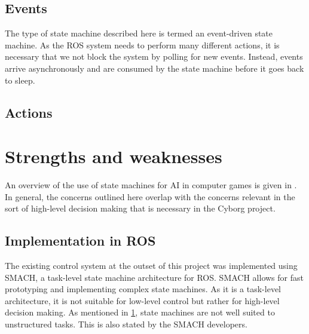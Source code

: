 \documentclass[\rootfolder/main.tex]{subfiles}
\begin{document}

\subsection{Events}

The type of state machine described here is termed an event-driven state machine.
As the ROS system needs to perform many different actions, it is necessary that we not block the system by polling for new events.
Instead, events arrive asynchronously and are consumed by the state machine before it goes back to sleep.


\subsection{Actions}

\section{Strengths and weaknesses}
\label{sec:state_machine_strength_weaknesses}

An overview of the use of state machines for AI in computer games is given in \cite{Millington2009}.
In general, the concerns outlined here overlap with the concerns relevant in the sort of high-level decision making that is necessary in the Cyborg project.

\subsection{Implementation in ROS}

The existing control system at the outset of this project was implemented using SMACH, a task-level state machine architecture for ROS.
SMACH allows for fast prototyping and implementing complex state machines.
As it is a task-level architecture, it is not suitable for low-level control but rather for high-level decision making.
As mentioned in \cref{sec:state_machine_strength_weaknesses}, state machines are not well suited to unstructured tasks.
This is also stated by the SMACH developers.
\end{document}
